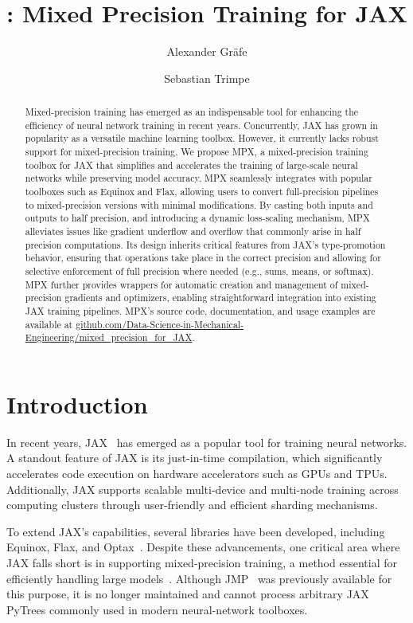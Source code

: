 \documentclass[logo]{dsme}
\title{\mpx{}: Mixed Precision Training for JAX}
\author[1]{Alexander Gräfe}
\author[1]{Sebastian Trimpe}
\affil[1]{Institute for Data Science in Mechanical Engineering (DSME), RWTH Aachen University}
\newcommand{\mpx}{\textsc{MPX}}
\begin{document}
\sloppy
\maketitle
\begin{abstract}
Mixed-precision training has emerged as an indispensable tool for enhancing the efficiency of neural network training in recent years. 
    Concurrently, JAX has grown in popularity as a versatile machine learning toolbox.
    However, it currently lacks robust support for mixed-precision training.
    We propose MPX, a mixed-precision training toolbox for JAX that simplifies and accelerates the training of large-scale neural networks while preserving model accuracy. 
    MPX seamlessly integrates with popular toolboxes such as Equinox and Flax, allowing users to convert full-precision pipelines to mixed-precision versions with minimal modifications. 
    By casting both inputs and outputs to half precision, and introducing a dynamic loss-scaling mechanism, MPX alleviates issues like gradient underflow and overflow that commonly arise in half precision computations. 
    Its design inherits critical features from JAX's type-promotion behavior, ensuring that operations take place in the correct precision and allowing for selective enforcement of full precision where needed (e.g., sums, means, or softmax). 
    MPX further provides wrappers for automatic creation and management of mixed-precision gradients and optimizers, enabling straightforward integration into existing JAX training pipelines.
    \mpx{}'s source code, documentation, and usage examples are available at \url{github.com/Data-Science-in-Mechanical-Engineering/mixed_precision_for_JAX}.
\end{abstract}

\section{Introduction}

In recent years, JAX~\citep{deepmind2020jax} has emerged as a popular tool for training neural networks. 
A standout feature of JAX is its just-in-time compilation, which significantly accelerates code execution on hardware accelerators such as GPUs and TPUs. 
Additionally, JAX supports scalable multi-device and multi-node training across computing clusters through user-friendly and efficient sharding mechanisms.

To extend JAX's capabilities, several libraries have been developed, including Equinox, Flax, and Optax~\citep{kidger2021equinox,flax2020github,deepmind2020jax}. 
Despite these advancements, one critical area where JAX falls short is in supporting mixed-precision training, a method essential for efficiently handling large models~\citep{mixed_precision_paper}. 
Although JMP~\citep{jmp} was previously available for this purpose, it is no longer maintained and cannot process arbitrary JAX PyTrees commonly used in modern neural-network toolboxes.
\end{document}
